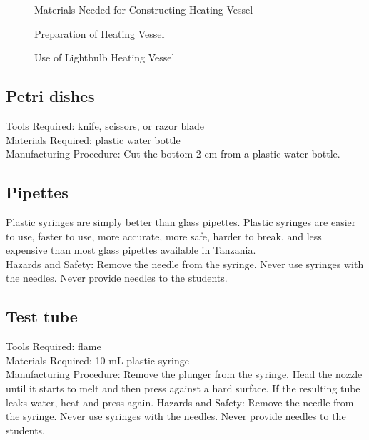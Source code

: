 \begin{figure}[h]
\begin{center}
\def\svgwidth{170pt}

\caption{Materials Needed for Constructing Heating Vessel}
\label{fig:heating vessel materials}
\end{center}
\end{figure}

\begin{figure}[h]
\begin{center}
\def\svgwidth{180pt}

\caption{Preparation of Heating Vessel}
\label{fig:heating vessel preparation}
\end{center}
\end{figure}

\begin{figure}[h!]
\begin{center}
\def\svgwidth{90pt}

\caption{Use of Lightbulb Heating Vessel}
\label{fig:heating vessel use}
\end{center}
\end{figure}

\subsection*{Petri dishes}
Tools Required: knife, scissors, or razor blade\\
Materials Required: plastic water bottle\\
Manufacturing Procedure: Cut the bottom 2 cm from a plastic water bottle.

\subsection*{Pipettes}
Plastic syringes are simply better than glass pipettes. Plastic syringes are easier to use, faster to use, more accurate, more safe, harder to break, and less expensive than most glass pipettes available in Tanzania.\\
Hazards and Safety: Remove the needle from the syringe. Never use syringes with the needles. Never provide needles to the students.


\subsection*{Test tube}
Tools Required: flame\\
Materials Required: 10 mL plastic syringe\\
Manufacturing Procedure: Remove the plunger from the syringe. Head the nozzle until it starts to melt and then press against a hard surface. If the resulting tube leaks water, heat and press again.
Hazards and Safety: Remove the needle from the syringe. Never use syringes with the needles. Never provide needles to the students.

